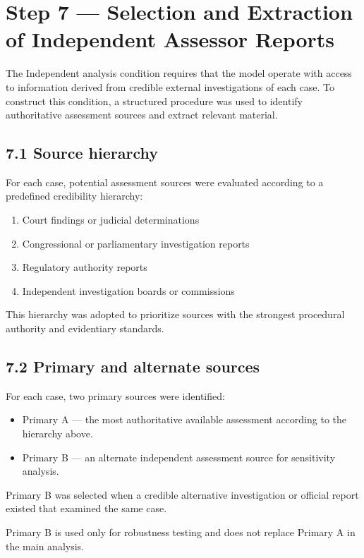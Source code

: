 {\section*{Step 7 — Selection and Extraction of Independent Assessor Reports}

The Independent analysis condition requires that the model operate with access to information derived from credible external investigations of each case. To construct this condition, a structured procedure was used to identify authoritative assessment sources and extract relevant material.

\subsection*{7.1 Source hierarchy}

For each case, potential assessment sources were evaluated according to a predefined credibility hierarchy:

\begin{enumerate}
\item Court findings or judicial determinations
\item Congressional or parliamentary investigation reports
\item Regulatory authority reports
\item Independent investigation boards or commissions
\end{enumerate}

This hierarchy was adopted to prioritize sources with the strongest procedural authority and evidentiary standards.

\subsection*{7.2 Primary and alternate sources}

For each case, two primary sources were identified:

\begin{itemize}
\item Primary A — the most authoritative available assessment according to the hierarchy above.
\item Primary B — an alternate independent assessment source for sensitivity analysis.
\end{itemize}

Primary B was selected when a credible alternative investigation or official report existed that examined the same case.

Primary B is used only for robustness testing and does not replace Primary A in the main analysis.

}
